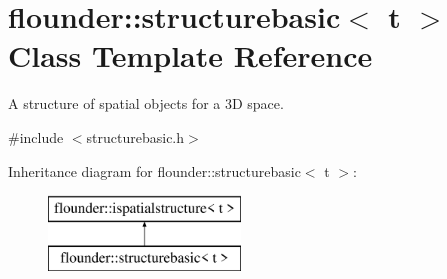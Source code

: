 \hypertarget{classflounder_1_1structurebasic}{}\section{flounder\+:\+:structurebasic$<$ t $>$ Class Template Reference}
\label{classflounder_1_1structurebasic}


A structure of spatial objects for a 3D space.  




{\ttfamily \#include $<$structurebasic.\+h$>$}

Inheritance diagram for flounder\+:\+:structurebasic$<$ t $>$\+:\begin{figure}[H]
\begin{center}
\leavevmode
\includegraphics[height=2.000000cm]{classflounder_1_1structurebasic}
\end{center}
\end{figure}
